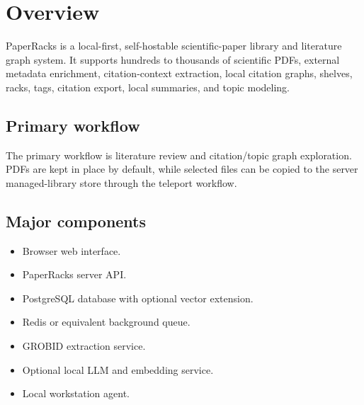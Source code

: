 \section{Overview}

PaperRacks is a local-first, self-hostable scientific-paper library and literature graph system. It supports hundreds to thousands of scientific PDFs, external metadata enrichment, citation-context extraction, local citation graphs, shelves, racks, tags, citation export, local summaries, and topic modeling.

\subsection{Primary workflow}

The primary workflow is literature review and citation/topic graph exploration. PDFs are kept in place by default, while selected files can be copied to the server managed-library store through the teleport workflow.

\subsection{Major components}

\begin{itemize}[noitemsep]
  \item Browser web interface.
  \item PaperRacks server API.
  \item PostgreSQL database with optional vector extension.
  \item Redis or equivalent background queue.
  \item GROBID extraction service.
  \item Optional local LLM and embedding service.
  \item Local workstation agent.
\end{itemize}
